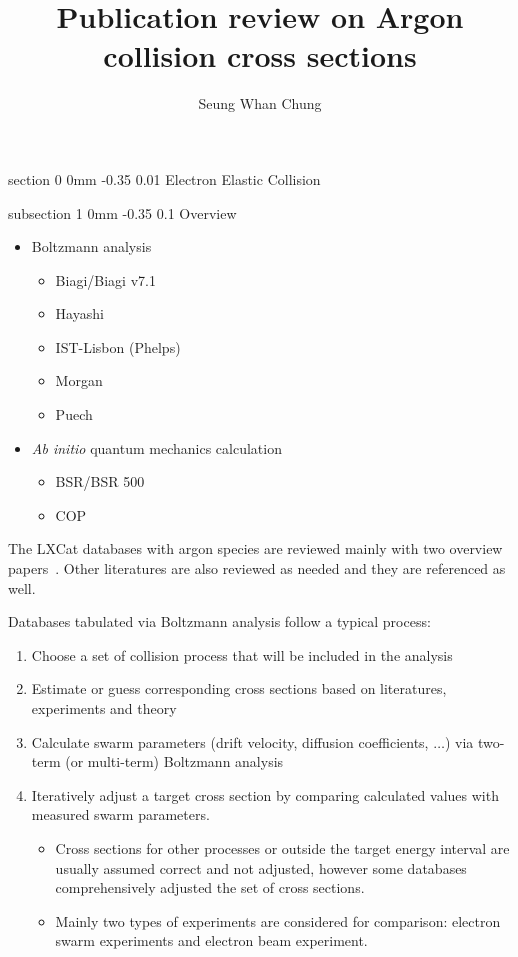 \documentclass[11pt]{article}
\title{Publication review on Argon collision cross sections}
\author{Seung Whan Chung}
\makeatletter
\renewcommand{\section}{\@startsection
{section}%
{0}%
{0mm}%
{-0.35\baselineskip}%
{0.01\baselineskip}%
{\normalfont\Large\bfseries\color{myTan}}}%
\renewcommand{\subsection}{\@startsection
{subsection}%
{1}%
{0mm}%
{-0.35\baselineskip}%
{0.1\baselineskip}%
{\normalfont\large\bfseries\color{myTan}}}%
\makeatother
\begin{document}
\maketitle


\section{Electron Elastic Collision}

\subsection{Overview}
\begin{itemize}
\item Boltzmann analysis
\begin{itemize}
\item Biagi/Biagi v7.1
\item Hayashi
\item IST-Lisbon (Phelps)
\item Morgan
\item Puech
\end{itemize}
\item {\it Ab initio} quantum mechanics calculation
\begin{itemize}
\item BSR/BSR 500
\item COP
\end{itemize}
\end{itemize}
The LXCat databases with argon species are reviewed mainly with two overview papers~\cite{Pitchford2013,Pitchford2017}.
Other literatures are also reviewed as needed and they are referenced as well.
\par
Databases tabulated via Boltzmann analysis follow a typical process:
\begin{enumerate}
\item Choose a set of collision process that will be included in the analysis
\item Estimate or guess corresponding cross sections based on literatures, experiments and theory
\item Calculate swarm parameters (drift velocity, diffusion coefficients, $\ldots$) via two-term (or multi-term) Boltzmann analysis
\item Iteratively adjust a target cross section by comparing calculated values with measured swarm parameters.
\begin{itemize}
\item Cross sections for other processes or outside the target energy interval are usually assumed correct and not adjusted,
however some databases comprehensively adjusted the set of cross sections.
\item Mainly two types of experiments are considered for comparison: electron swarm experiments and electron beam experiment.
\end{itemize}
\end{enumerate}
\end{document}
